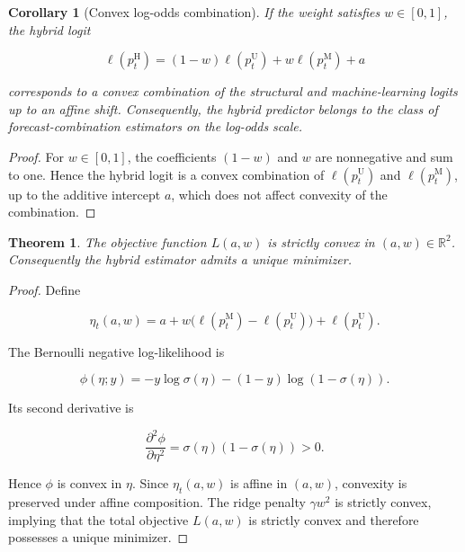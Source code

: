 \documentclass[a4paper,fleqn]{cas-dc}
\newtheorem{theorem}{Theorem}
\newtheorem{corollary}{Corollary}
\begin{document}
\begin{corollary}[Convex log-odds combination]
	
	If the weight satisfies $w\in[0,1]$, the hybrid logit
	
	\[
	\ell(p_t^{\mathrm{H}})
	=
	(1-w)\ell(p_t^{\mathrm{U}})+w\ell(p_t^{\mathrm{M}})+a
	\]
	
	corresponds to a convex combination of the structural and machine-learning logits up to an affine shift. Consequently, the hybrid predictor belongs to the class of forecast-combination estimators on the log-odds scale.
	
\end{corollary}

\begin{proof}
	
	For $w\in[0,1]$, the coefficients $(1-w)$ and $w$ are nonnegative and sum to one. Hence the hybrid logit is a convex combination of $\ell(p_t^{\mathrm{U}})$ and $\ell(p_t^{\mathrm{M}})$, up to the additive intercept $a$, which does not affect convexity of the combination.
	
\end{proof}


\begin{theorem}
	
	The objective function $L(a,w)$ is strictly convex in $(a,w)\in\mathbb{R}^2$. Consequently the hybrid estimator admits a unique minimizer.
	
\end{theorem}

\begin{proof}
	
	Define
	
	\[
	\eta_t(a,w)
	=
	a+w\bigl(\ell(p_t^{\mathrm{M}})-\ell(p_t^{\mathrm{U}})\bigr)
	+\ell(p_t^{\mathrm{U}}).
	\]
	
	The Bernoulli negative log-likelihood is
	
	\[
	\phi(\eta;y)
	=
	-y\log\sigma(\eta)-(1-y)\log(1-\sigma(\eta)).
	\]
	
	Its second derivative is
	
	\[
	\frac{\partial^2 \phi}{\partial \eta^2}
	=
	\sigma(\eta)(1-\sigma(\eta))>0.
	\]
	
	Hence $\phi$ is convex in $\eta$. Since $\eta_t(a,w)$ is affine in $(a,w)$, convexity is preserved under affine composition. The ridge penalty $\gamma w^2$ is strictly convex, implying that the total objective $L(a,w)$ is strictly convex and therefore possesses a unique minimizer.
	
\end{proof}
\end{document}
